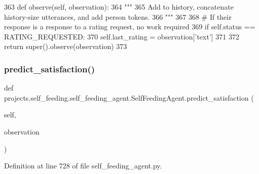 \begin{DoxyCode}
363     \textcolor{keyword}{def }observe(self, observation):
364         \textcolor{stringliteral}{"""}
365 \textcolor{stringliteral}{        Add to history, concatenate history-size utterances, and add person tokens.}
366 \textcolor{stringliteral}{        """}
367 
368         \textcolor{comment}{# If their response is a response to a rating request, no work required}
369         \textcolor{keywordflow}{if} self.status == RATING\_REQUESTED:
370             self.last\_rating = observation[\textcolor{stringliteral}{'text'}]
371 
372         \textcolor{keywordflow}{return} super().observe(observation)
373 
\end{DoxyCode}
\mbox{\label{classprojects_1_1self__feeding_1_1self__feeding__agent_1_1SelfFeedingAgent_abf84c3ae5ee4a7f80dfe3e441ad170b2}} 
\subsubsection{\texorpdfstring{predict\+\_\+satisfaction()}{predict\_satisfaction()}}
{\footnotesize\ttfamily def projects.\+self\+\_\+feeding.\+self\+\_\+feeding\+\_\+agent.\+Self\+Feeding\+Agent.\+predict\+\_\+satisfaction (\begin{DoxyParamCaption}\item[{}]{self,  }\item[{}]{observation }\end{DoxyParamCaption})}



Definition at line 728 of file self\+\_\+feeding\+\_\+agent.\+py.


